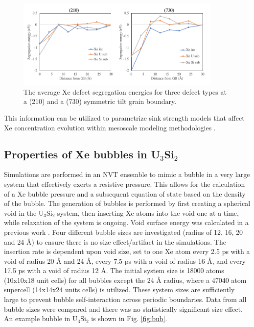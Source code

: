 \documentclass[review]{elsarticle}
\begin{document}
\begin{figure}[hbt]
	\centering
	\includegraphics[width=0.9\textwidth]{Xe_Eseg.png}
 \caption{The average Xe defect segregation energies for three defect types at a (210) and a (730) symmetric tilt grain boundary.}\label{fig:xeseg}
\end{figure}

\FloatBarrier

This information can be utilized to parametrize sink strength models that affect Xe concentration evolution within mesoscale modeling methodologies \cite{was2007}.

\subsection{Properties of Xe bubbles in U$_3$Si$_2$}

Simulations are performed in an NVT ensemble to mimic a bubble in a very large system that effectively exerts a resistive pressure. This allows for the calculation of a Xe bubble pressure and a subsequent equation of state based on the density of the bubble. The generation of bubbles is performed by first creating a spherical void in the U$_3$Si$_2$ system, then inserting Xe atoms into the void one at a time, while relaxation of the system is ongoing. Void surface energy was calculated in a previous work \cite{beeler_usi_gb}. Four different bubble sizes are investigated (radius of 12, 16, 20 and 24 {\AA}) to ensure there is no size effect/artifact in the simulations. The insertion rate is dependent upon void size, set to one Xe atom every 2.5 ps with a void of radius 20 {\AA} and 24 {\AA}, every 7.5 ps with a void of radius 16 {\AA}, and every 17.5 ps with a void of radius 12 {\AA}. The initial system size is 18000 atoms (10x10x18 unit cells) for all bubbles except the 24 {\AA} radius, where a 47040 atom supercell (14x14x24 units cells) is utilized. These system sizes are sufficiently large to prevent bubble self-interaction across periodic boundaries. Data from all bubble sizes were compared and there was no statistically significant size effect. An example bubble in U$_3$Si$_2$ is shown in Fig. \ref{fig:bub}.
\end{document}
